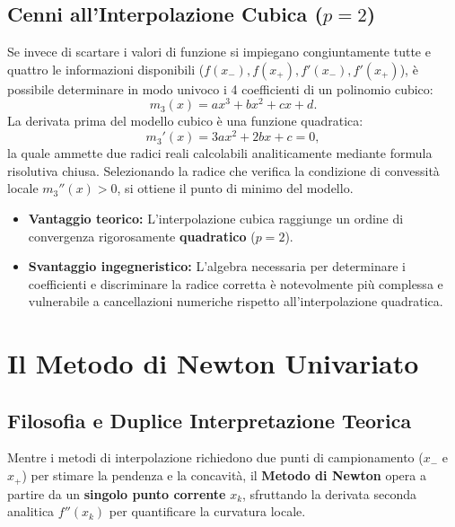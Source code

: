 \subsection{Cenni all'Interpolazione Cubica ($p = 2$)}
Se invece di scartare i valori di funzione si impiegano congiuntamente tutte e quattro le informazioni disponibili ($f(x_-), f(x_+), f'(x_-), f'(x_+)$), \`e possibile determinare in modo univoco i 4 coefficienti di un polinomio cubico:
\begin{equation}
    m_3(x) = a x^3 + b x^2 + c x + d.
\end{equation}
La derivata prima del modello cubico \`e una funzione quadratica:
\begin{equation}
    m_3'(x) = 3 a x^2 + 2 b x + c = 0,
\end{equation}
la quale ammette due radici reali calcolabili analiticamente mediante formula risolutiva chiusa. Selezionando la radice che verifica la condizione di convessit\`a locale $m_3''(x) > 0$, si ottiene il punto di minimo del modello.
\begin{itemize}
    \item \textbf{Vantaggio teorico:} L'interpolazione cubica raggiunge un ordine di convergenza rigorosamente \textbf{quadratico} ($p = 2$).
    \item \textbf{Svantaggio ingegneristico:} L'algebra necessaria per determinare i coefficienti e discriminare la radice corretta \`e notevolmente pi\`u complessa e vulnerabile a cancellazioni numeriche rispetto all'interpolazione quadratica.
\end{itemize}

\FloatBarrier
\section{Il Metodo di Newton Univariato}
\label{sec:univariata-metodo-newton}

\subsection{Filosofia e Duplice Interpretazione Teorica}
Mentre i metodi di interpolazione richiedono due punti di campionamento ($x_-$ e $x_+$) per stimare la pendenza e la concavit\`a, il \textbf{Metodo di Newton} opera a partire da un \textbf{singolo punto corrente} $x_k$, sfruttando la derivata seconda analitica $f''(x_k)$ per quantificare la curvatura locale.

